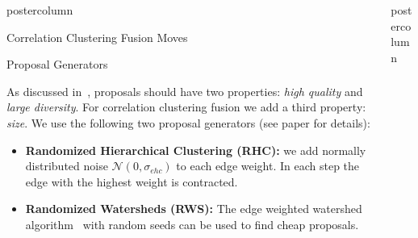 \documentclass[final,hyperref={pdfpagelabels=false}]{beamer}
\newlength{\columnheight}
\begin{document}
\begin{frame}
\begin{columns}
\begin{column}{.49\textwidth}
\begin{beamercolorbox}[center,wd=\textwidth]{postercolumn}
\begin{minipage}[T]{.95\textwidth}
{\begin{block}{Correlation Clustering Fusion Moves}
            \end{block}
            \vfill
            \begin{block}{Proposal Generators}
            \begin{small}
            As discussed in~\cite{Lempitsky-2010}, proposals
            should have two properties: \emph{high quality} 
            and \emph{large diversity}.
            For correlation clustering fusion we add a third
            property: \emph{size}.  
            We use the following two proposal generators (see paper for details):
            \begin{itemize}
                \item \textbf{Randomized Hierarchical Clustering (RHC):}
                we add normally distributed noise  $\mathcal{N}(0, \sigma_{ehc})$ to each edge weight.
                In each step the edge with the highest weight is contracted.

                \item \textbf{Randomized Watersheds (RWS):}
                The edge weighted watershed algorithm~\cite{meyer_2013}
                with random seeds can be used to find
                cheap proposals.
            \end{itemize}
            \end{small}
            \end{block}

          }
        \end{minipage}
      \end{beamercolorbox}
    \end{column}

    \begin{column}{.49\textwidth}
      \begin{beamercolorbox}[center,wd=\textwidth]{postercolumn}
        \begin{minipage}[T]{.95\textwidth} %
          \parbox[t][\columnheight]{\textwidth}{ %
            
}
\end{minipage}
\end{beamercolorbox}
\end{column}
\end{columns}
\end{frame}
\end{document}
